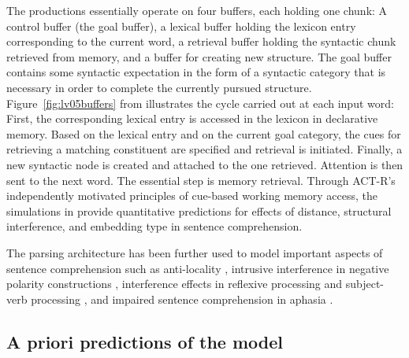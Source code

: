 \documentclass{cambridge7A}\usepackage[]{graphicx}\usepackage[]{color}
\begin{document}
%
The productions essentially operate on four buffers, each holding one chunk: A control buffer (the goal buffer), a lexical buffer holding the lexicon entry corresponding to the current word, a retrieval buffer holding the syntactic chunk retrieved from memory, and a buffer for creating new structure.
The goal buffer contains some syntactic expectation in the form of a syntactic category that is necessary in order to complete the currently pursued structure.
Figure~\ref{fig:lv05buffers} from \cite{LewisVasishth2005} illustrates the cycle carried out at each input word: First, the corresponding lexical entry is accessed in the lexicon in declarative memory. Based on the lexical entry and on the current goal category, the cues for retrieving a matching constituent are specified and retrieval is initiated. Finally, a new syntactic node is created and attached to the one retrieved. Attention is then sent to the next word. The essential step is memory retrieval. Through ACT-R's independently motivated principles of cue-based working memory access, the simulations in \cite{LewisVasishth2005} provide quantitative predictions for effects of distance, structural interference, and embedding type in sentence comprehension.


The  parsing architecture has been further used to model important aspects of sentence comprehension such as anti-locality \citep{VasishthLewis2006}, intrusive interference in negative polarity constructions \citep{VasishthBruessowLewis2008}, interference effects in reflexive processing \citep{PatilVasishthLewis2012,ParkerPhillips2014,JaegerEngelmannVasishth2015} and subject-verb processing
\citep{WagersLauPhillips2009,DillonMishlerSloggett2013}, and impaired sentence comprehension in aphasia \citep{PatilEtAl2016,MaetzigEtAltopics2018}.

\subsection{A priori predictions of the model} \label{lv05predictions}
\end{document}
